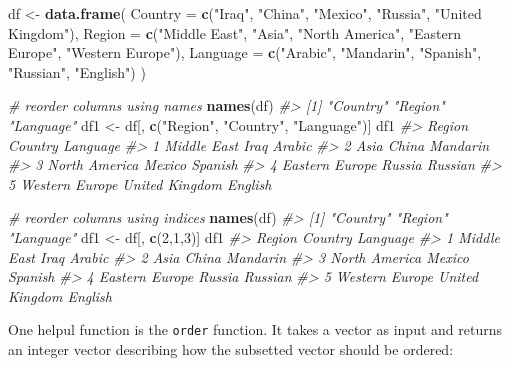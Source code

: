 \documentclass[]{book}
\newenvironment{Shaded}{\begin{snugshade}}{\end{snugshade}}
\newcommand{\KeywordTok}[1]{\textcolor[rgb]{0.13,0.29,0.53}{\textbf{#1}}}
\newcommand{\DataTypeTok}[1]{\textcolor[rgb]{0.13,0.29,0.53}{#1}}
\newcommand{\DecValTok}[1]{\textcolor[rgb]{0.00,0.00,0.81}{#1}}
\newcommand{\StringTok}[1]{\textcolor[rgb]{0.31,0.60,0.02}{#1}}
\newcommand{\CommentTok}[1]{\textcolor[rgb]{0.56,0.35,0.01}{\textit{#1}}}
\newcommand{\NormalTok}[1]{#1}
\begin{document}
\begin{Shaded}
\begin{Highlighting}[]
\NormalTok{df <-}\StringTok{ }\KeywordTok{data.frame}\NormalTok{(}
  \DataTypeTok{Country =} \KeywordTok{c}\NormalTok{(}\StringTok{"Iraq"}\NormalTok{, }\StringTok{"China"}\NormalTok{, }\StringTok{"Mexico"}\NormalTok{, }\StringTok{"Russia"}\NormalTok{, }\StringTok{"United Kingdom"}\NormalTok{),}
  \DataTypeTok{Region =} \KeywordTok{c}\NormalTok{(}\StringTok{"Middle East"}\NormalTok{, }\StringTok{"Asia"}\NormalTok{, }\StringTok{"North America"}\NormalTok{, }\StringTok{"Eastern Europe"}\NormalTok{, }\StringTok{"Western Europe"}\NormalTok{),}
  \DataTypeTok{Language =} \KeywordTok{c}\NormalTok{(}\StringTok{"Arabic"}\NormalTok{, }\StringTok{"Mandarin"}\NormalTok{, }\StringTok{"Spanish"}\NormalTok{, }\StringTok{"Russian"}\NormalTok{, }\StringTok{"English"}\NormalTok{)}
\NormalTok{)}

\CommentTok{# reorder columns using names}
\KeywordTok{names}\NormalTok{(df)}
\CommentTok{#> [1] "Country"  "Region"   "Language"}
\NormalTok{df1 <-}\StringTok{ }\NormalTok{df[, }\KeywordTok{c}\NormalTok{(}\StringTok{"Region"}\NormalTok{, }\StringTok{"Country"}\NormalTok{, }\StringTok{"Language"}\NormalTok{)]}
\NormalTok{df1}
\CommentTok{#>           Region        Country Language}
\CommentTok{#> 1    Middle East           Iraq   Arabic}
\CommentTok{#> 2           Asia          China Mandarin}
\CommentTok{#> 3  North America         Mexico  Spanish}
\CommentTok{#> 4 Eastern Europe         Russia  Russian}
\CommentTok{#> 5 Western Europe United Kingdom  English}

\CommentTok{# reorder columns using indices}
\KeywordTok{names}\NormalTok{(df)}
\CommentTok{#> [1] "Country"  "Region"   "Language"}
\NormalTok{df1 <-}\StringTok{ }\NormalTok{df[, }\KeywordTok{c}\NormalTok{(}\DecValTok{2}\NormalTok{,}\DecValTok{1}\NormalTok{,}\DecValTok{3}\NormalTok{)]}
\NormalTok{df1}
\CommentTok{#>           Region        Country Language}
\CommentTok{#> 1    Middle East           Iraq   Arabic}
\CommentTok{#> 2           Asia          China Mandarin}
\CommentTok{#> 3  North America         Mexico  Spanish}
\CommentTok{#> 4 Eastern Europe         Russia  Russian}
\CommentTok{#> 5 Western Europe United Kingdom  English}
\end{Highlighting}
\end{Shaded}

One helpul function is the \texttt{order} function. It takes a vector as
input and returns an integer vector describing how the subsetted vector
should be ordered:
\end{document}
